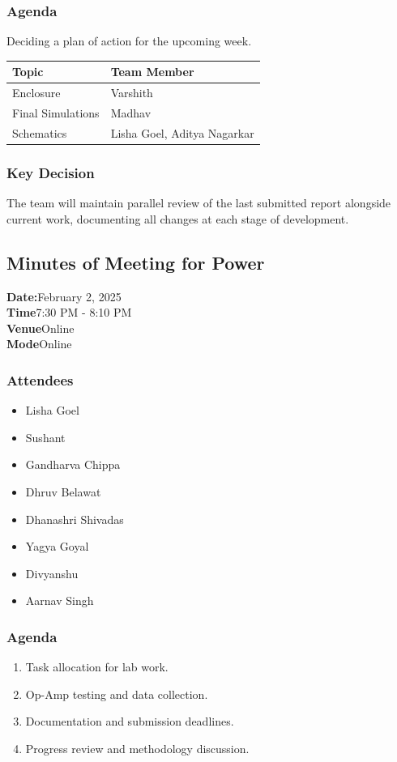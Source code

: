 \documentclass[12pt,a4paper]{article}
\begin{document}
\subsubsection*{Agenda}
Deciding a plan of action for the upcoming week.
\begin{longtable}{|l|l|}
    \hline
    \textbf{Topic} & \textbf{Team Member} \\
    \hline
    Enclosure  & Varshith \\
    \hline
    Final Simulations   & Madhav \\
    \hline
    Schematics   & Lisha Goel, Aditya Nagarkar \\
    \hline
\end{longtable}

\subsubsection*{Key Decision}
The team will maintain parallel review of the last submitted report alongside current work, documenting all changes at each stage of development.
\subsection*{Minutes of Meeting for Power}

\textbf{Date:}February 2, 2025\\
\textbf{Time}7:30 PM - 8:10 PM\\
\textbf{Venue}Online\\
\textbf{Mode}Online\\

\subsubsection*{Attendees}
\begin{itemize}
    \item Lisha Goel
    \item Sushant
    \item Gandharva Chippa
    \item Dhruv Belawat
    \item Dhanashri Shivadas
    \item Yagya Goyal
    \item Divyanshu
    \item Aarnav Singh
\end{itemize}

\subsubsection*{Agenda}
\begin{enumerate}
    \item Task allocation for lab work.
    \item Op-Amp testing and data collection.
    \item Documentation and submission deadlines.
    \item Progress review and methodology discussion.
\end{enumerate}
\end{document}
